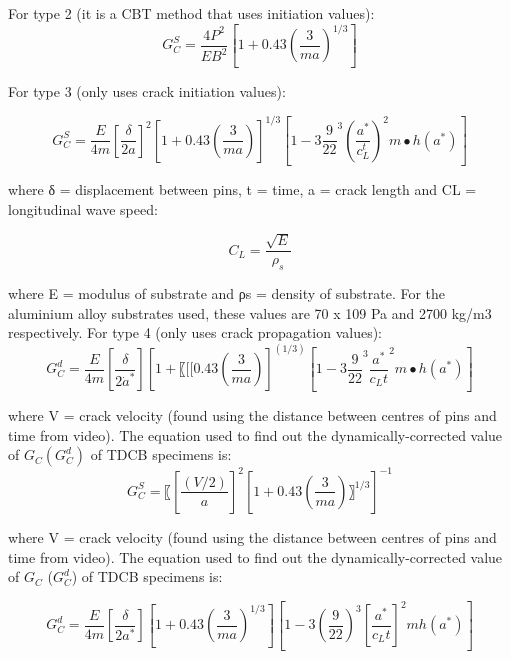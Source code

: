 \documentclass[numbers=noendperiod,chapterprefix=on]{icldt} %
\begin{document}
For type 2 (it is a CBT method that uses initiation values):
\begin{equation} 
G_C^S=\frac{4P^2}{EB^2}\left[1+0.43\left(\frac{3}{ma}\right) ^{1/3} \right]
\end{equation}

For type 3 (only uses crack initiation values):

\begin{equation} 
G_C^S= \frac{E}{4m}\left[\frac{\delta}{2a}\right]^2 \left[1+0.43(\frac{3}{ma})\right]^{1/3} \left[1-3\frac{9}{22}^3 \left(\frac{a^*}{c_L^{ t}}\right) ^2 m∙h(a^*)\right]
\end{equation}

where δ = displacement between pins, t = time, a = crack length and CL = longitudinal wave speed:

\begin{equation} 
C_L= \frac{\sqrt{E}}{\rho_s}
\end{equation}

where E = modulus of substrate and ρs = density of substrate. For the aluminium alloy substrates used, these values are 70 x 109 Pa and 2700 kg/m3 respectively. 
For type 4 (only uses crack propagation values):
\begin{equation} 
G_C^d=  \frac{E}{4m} \left[\frac{\delta}{2\dot{a}^\ast}\right]\left[1+〖[[0.43\left( \frac{3}{ma}\right) \right]^(1/3)\left[1-3\frac{9}{22}^3 {\frac{a^\ast}{c_L t}}^2 m∙h(a^\ast)\right] 
\end{equation}

where V = crack velocity (found using the distance between centres of pins and time from video). The equation used to find out the dynamically-corrected value of $G_C (G^d_C)$ of TDCB specimens is:
\begin{equation} 
G_C^S=〖\left[\frac{(V/2)}{a}\right]^2 \left[1+0.43\left(\frac{3}{ma}\right) 〗^{1/3}\right]^{-1}
\end{equation}

where V = crack velocity (found using the distance between centres of pins and time from video). The equation used to find out the dynamically-corrected value of $G_C$ ($G^d_C$) of TDCB specimens is: 

\begin{equation} 
G_C^d= \frac{E}{4m}  
\left[\frac{\delta}{2a^\ast}\right]
\left[1 +0.43\left( \frac{3}{ma}\right)^{1/3} \right] 
\left[1-3\left( \frac{9}{22}\right) ^3 \left[\frac{a^\ast}{c_L t}\right]^2mh(a^\ast)\right]
\end{equation}
\end{document}
